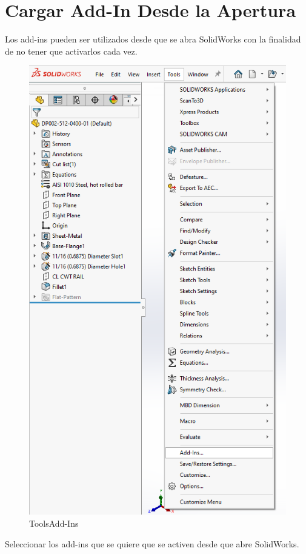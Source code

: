 \documentclass{report}
\begin{document}
\chapter{Cargar Add-In Desde la Apertura}

Los add-ins pueden ser utilizados desde que se abra SolidWorks con la finalidad de no tener que activarlos cada vez.

\begin{figure}[H]
	\centering
	\includegraphics[width=0.85\linewidth, height=0.55\textheight,keepaspectratio]{Imagenes/solidworks_addin_01}
	\caption{Tools\textrightarrow Add-Ins}
	\label{fig:solidworksaddin01}
\end{figure}

Seleccionar los add-ins que se quiere que se activen desde que abre SolidWorks.
\end{document}
